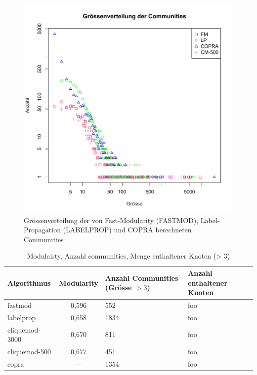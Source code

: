 \begin{figure}[h]
  \centering
  \includegraphics[scale=0.8]{images/community-size-dist.pdf}
  \caption{Gr\"ossenverteilung der von Fast-Modularity (FASTMOD),
    Label-Propagation (LABELPROP) und COPRA berechneten Communities}
  \label{fig:community-size-dist}
\end{figure}

\begin{table}[h]
  \centering
  \begin{tabular}{l|c|p{4cm}|p{4cm}}
    Algorithmus & Modularity & Anzahl Communities (Gr\"osse $> 3$) &
    Anzahl enthaltener Knoten \\
    \hline
    fastmod & 0,596 & 552 & foo \\
    labelprop & 0,658 & 1834 & foo \\
    cliquemod-3000 & 0,670 & 811 & foo \\
    cliquemod-500 & 0,677 & 451 & foo \\
    copra & --- & 1354 & foo
  \end{tabular}
  \caption{Modulairty, Anzahl communities, Menge enthaltener Knoten (> 3)}
  \label{tab:foo}
\end{table}

